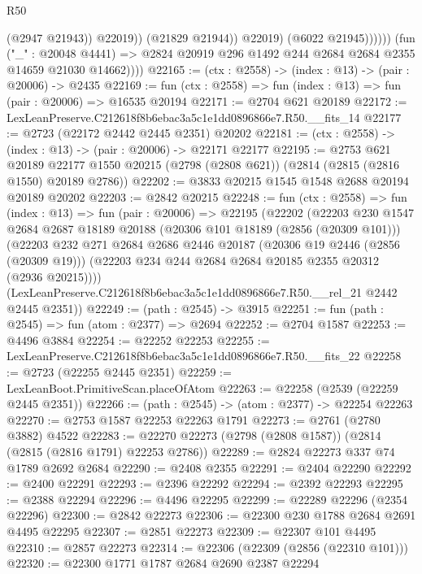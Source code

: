 \begin{lexlean}{R50}
\begin{coremodule}
                              (@2947 @21943))
                            @22019))
                        (@21829 @21944))
                      @22019)
                    (@6022 @21945))))))
          (fun ("_" : @20048 @4441) =>
          @2824 @20919 @296 @1492 @244 @2684 @2684 @2355 @14659 @21030 @14662))))
@22165 := (ctx : @2558) -> (index : @13) -> (pair : @20006) -> @2435
@22169 := fun (ctx : @2558) => fun (index : @13) => fun (pair : @20006) => @16535 @20194
@22171 := @2704 @621 @20189
@22172 := LexLeanPreserve.C212618f8b6ebac3a5c1e1dd0896866e7.R50.__fits_14
@22177 := @2723 (@22172 @2442 @2445 @2351) @20202
@22181 := (ctx : @2558) -> (index : @13) -> (pair : @20006) -> @22171 @22177
@22195 := @2753
    @621
    @20189
    @22177
    @1550
    @20215
    (@2798 (@2808 @621))
    (@2814 (@2815 (@2816 @1550) @20189 @2786))
@22202 := @3833 @20215 @1545 @1548 @2688 @20194 @20189 @20202
@22203 := @2842 @20215
@22248 := fun (ctx : @2558) =>
  fun (index : @13) =>
  fun (pair : @20006) =>
  @22195
    (@22202
      (@22203
        @230
        @1547
        @2684
        @2687
        @18189
        @20188
        (@20306 @101 @18189 (@2856 (@20309 @101)))
        (@22203
          @232
          @271
          @2684
          @2686
          @2446
          @20187
          (@20306 @19 @2446 (@2856 (@20309 @19)))
          (@22203 @234 @244 @2684 @2684 @20185 @2355 @20312 (@2936 @20215))))
      (LexLeanPreserve.C212618f8b6ebac3a5c1e1dd0896866e7.R50.__rel_21 @2442 @2445 @2351))
@22249 := (path : @2545) -> @3915
@22251 := fun (path : @2545) => fun (atom : @2377) => @2694
@22252 := @2704 @1587
@22253 := @4496 @3884
@22254 := @22252 @22253
@22255 := LexLeanPreserve.C212618f8b6ebac3a5c1e1dd0896866e7.R50.__fits_22
@22258 := @2723 (@22255 @2445 @2351)
@22259 := LexLeanBoot.PrimitiveScan.placeOfAtom
@22263 := @22258 (@2539 (@22259 @2445 @2351))
@22266 := (path : @2545) -> (atom : @2377) -> @22254 @22263
@22270 := @2753 @1587 @22253 @22263 @1791
@22273 := @2761 (@2780 @3882) @4522
@22283 := @22270 @22273 (@2798 (@2808 @1587)) (@2814 (@2815 (@2816 @1791) @22253 @2786))
@22289 := @2824 @22273 @337 @74 @1789 @2692 @2684
@22290 := @2408 @2355
@22291 := @2404 @22290
@22292 := @2400 @22291
@22293 := @2396 @22292
@22294 := @2392 @22293
@22295 := @2388 @22294
@22296 := @4496 @22295
@22299 := @22289 @22296 (@2354 @22296)
@22300 := @2842 @22273
@22306 := @22300 @230 @1788 @2684 @2691 @4495 @22295
@22307 := @2851 @22273
@22309 := @22307 @101 @4495
@22310 := @2857 @22273
@22314 := @22306 (@22309 (@2856 (@22310 @101)))
@22320 := @22300 @1771 @1787 @2684 @2690 @2387 @22294

\end{coremodule}
\end{lexlean}
